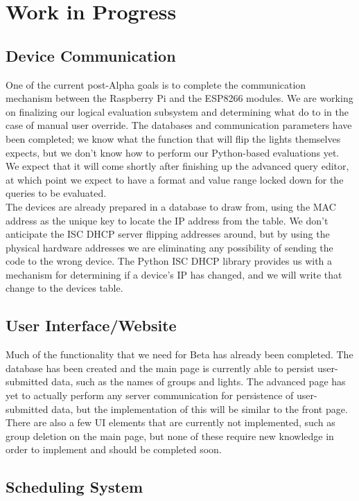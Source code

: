 \documentclass[10pt,draftclsnofoot,onecolumn]{IEEEtran}
\begin{document}
\section{Work in Progress}

\subsection{Device Communication}

One of the current post-Alpha goals is to complete the communication mechanism
between the Raspberry Pi and the ESP8266 modules. We are working on finalizing
our logical evaluation subsystem and determining what do to in the case of
manual user override. The databases and communication parameters have been
completed; we know what the function that will flip the lights themselves
expects, but we don't know how to perform our Python-based evaluations yet. We
expect that it will come shortly after finishing up the advanced query editor,
at which point we expect to have a format and value range locked down for the
queries to be evaluated.\\

The devices are already prepared in a database to draw from, using the MAC
address as the unique key to locate the IP address from the table. We don't
anticipate the ISC DHCP server flipping addresses around, but by using the
physical hardware addresses we are eliminating any possibility of sending the
code to the wrong device. The Python ISC DHCP library provides us with a
mechanism for determining if a device's IP has changed, and we will write that
change to the devices table.

\subsection{User Interface/Website}

Much of the functionality that we need for Beta has already been completed.
The database has been created and the main page is currently able to persist
user-submitted data, such as the names of groups and lights.  The advanced page
has yet to actually perform any server communication for persistence of
user-submitted data, but the implementation of this will be similar to the
front page.  There are also a few UI elements that are currently not
implemented, such as group deletion on the main page, but none of these require
new knowledge in order to implement and should be completed soon.

\subsection{Scheduling System}
\end{document}
